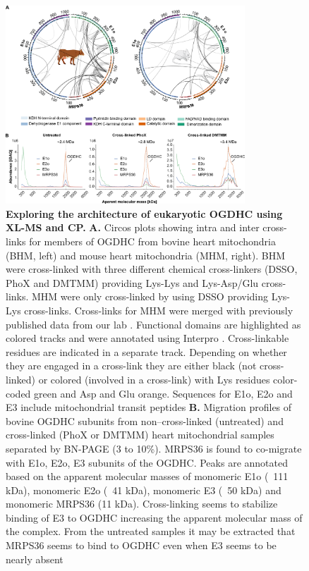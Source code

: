 \documentclass[times, twoside]{zHenriquesLab-StyleBioRxiv}
\begin{document}
\begin{figure}[ht]
    \centering
    \includegraphics[width=0.8\textwidth]{Figure2.png}
    \caption{\textbf{Exploring the architecture of eukaryotic OGDHC using XL-MS and CP.} \textbf{A.} Circos plots showing intra and inter cross-links for members of OGDHC from bovine heart mitochondria (BHM, left) and mouse heart mitochondria (MHM, right). BHM were cross-linked with three different chemical cross-linkers (DSSO, PhoX and DMTMM) providing Lys-Lys and Lys-Asp/Glu cross-links. MHM were only cross-linked by using DSSO providing Lys-Lys cross-links. Cross-links for MHM were merged with previously published data from our lab \cite{Liu_2018}. Functional domains are highlighted as colored tracks and were annotated using Interpro \cite{Blum_2021}. Cross-linkable residues are indicated in a separate track. Depending on whether they are engaged in a cross-link they are either black (not cross-linked) or colored (involved in a cross-link) with Lys residues color-coded green and Asp and Glu orange. Sequences for E1o, E2o and E3 include mitochondrial transit peptides \textbf{B.} Migration profiles of bovine OGDHC subunits from non–cross-linked (untreated) and cross-linked (PhoX or DMTMM) heart mitochondrial samples separated by BN-PAGE (3 to 10\%). MRPS36 is found to co-migrate with E1o, E2o, E3 subunits of the OGDHC. Peaks are annotated based on the apparent molecular masses of monomeric E1o (~111 kDa), monomeric E2o (~41 kDa), monomeric E3 (~50 kDa) and monomeric MRPS36 (11 kDa). Cross-linking seems to stabilize binding of E3 to OGDHC increasing the apparent molecular mass of the complex. From the untreated samples it may be extracted that MRPS36 seems to bind to OGDHC even when E3 seems to be nearly absent}
    \label{fig:img1}
\end{figure}
\end{document}
